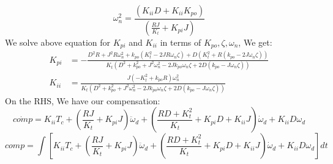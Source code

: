 	\[
	\omega_n^2 = \frac{(K_{ii}D+K_{ii}K_{po})}{(\frac{RJ}{K_t} + K_{pi}J )}
	\]
	We solve above equation for $ K_{pi} $ and $ K_{ii} $ in terms of $ K_{po},\zeta,\omega_n $, We get:
	\[
	\begin{split}
		K_{pi} &= -\frac{D^2R+J^2R\omega_n^2+k_{po}(K_t^2-2JR\omega_n\zeta)+D(K_t^2+R(k_{po}-2J\omega_n\zeta))} {K_t(D^2+k_{po}^2+J^2\omega_n^2-2Jk_{po}\omega_n\zeta+2D(k_{po}-J\omega_n\zeta))} \\
		K_{ii} &= \frac{J(-K_t^2+k_{po}R)\omega_n^2} {K_t(D^2+k_{po}^2+J^2\omega_n^2-2Jk_{po}\omega_n\zeta+2D(k_{po}-J\omega_n\zeta))}
	\end{split}
	\]
	On the RHS, We have our compensation:
	\[
	\dot{comp} = K_{ii}T_c +(\frac{RJ}{K_t} + K_{pi}J ) \ddot{\omega}_d + (\frac{RD + K_t^2}{K_t}+ K_{pi}D + K_{ii}J) \dot{\omega}_d+K_{ii}D\omega_d
	\]
	\[
	comp = \int \left[ K_{ii}T_c +(\frac{RJ}{K_t} + K_{pi}J ) \ddot{\omega}_d + (\frac{RD + K_t^2}{K_t}+ K_{pi}D + K_{ii}J) \dot{\omega}_d+K_{ii}D\omega_d\right] dt
	\]